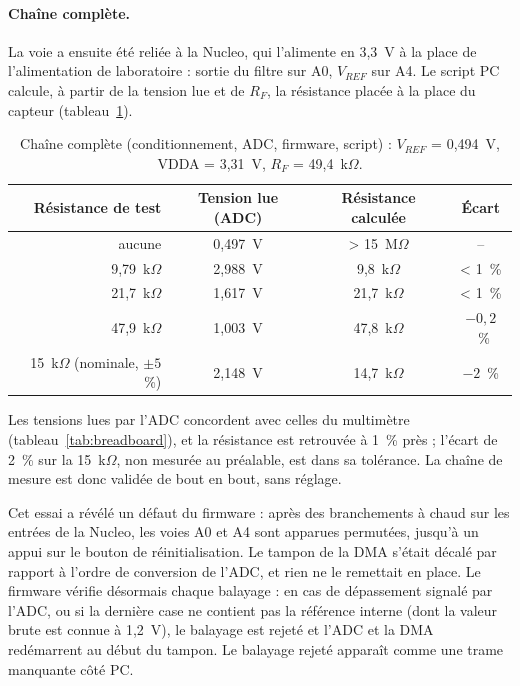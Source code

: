 \paragraph{Chaîne complète.} La voie a ensuite été reliée à la Nucleo, qui l'alimente en 3,3~V à la place de l'alimentation de laboratoire : sortie du filtre sur A0, $V_{REF}$ sur A4. Le script PC calcule, à partir de la tension lue et de $R_F$, la résistance placée à la place du capteur (tableau~\ref{tab:chaine}).

\begin{table}[H]
\centering
\begin{tabular}{@{}rccc@{}}
\toprule
\textbf{Résistance de test} & \textbf{Tension lue (ADC)} & \textbf{Résistance calculée} & \textbf{Écart} \\
\midrule
aucune & 0,497~V & > 15~M$\Omega$ & -- \\
9,79~k$\Omega$ & 2,988~V & 9,8~k$\Omega$ & < 1~\% \\
21,7~k$\Omega$ & 1,617~V & 21,7~k$\Omega$ & < 1~\% \\
47,9~k$\Omega$ & 1,003~V & 47,8~k$\Omega$ & $-0{,}2$~\% \\
15~k$\Omega$ (nominale, $\pm 5$~\%) & 2,148~V & 14,7~k$\Omega$ & $-2$~\% \\
\bottomrule
\end{tabular}
\caption{Chaîne complète (conditionnement, ADC, firmware, script) : $V_{REF}$ = 0,494~V, VDDA = 3,31~V, $R_F$ = 49,4~k$\Omega$.}
\label{tab:chaine}
\end{table}

Les tensions lues par l'ADC concordent avec celles du multimètre (tableau~\ref{tab:breadboard}), et la résistance est retrouvée à 1~\% près ; l'écart de 2~\% sur la 15~k$\Omega$, non mesurée au préalable, est dans sa tolérance. La chaîne de mesure est donc validée de bout en bout, sans réglage.

Cet essai a révélé un défaut du firmware : après des branchements à chaud sur les entrées de la Nucleo, les voies A0 et A4 sont apparues permutées, jusqu'à un appui sur le bouton de réinitialisation. Le tampon de la DMA s'était décalé par rapport à l'ordre de conversion de l'ADC, et rien ne le remettait en place. Le firmware vérifie désormais chaque balayage : en cas de dépassement signalé par l'ADC, ou si la dernière case ne contient pas la référence interne (dont la valeur brute est connue à 1,2~V), le balayage est rejeté et l'ADC et la DMA redémarrent au début du tampon. Le balayage rejeté apparaît comme une trame manquante côté PC.


